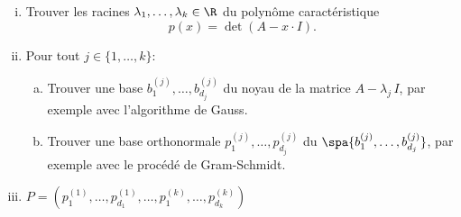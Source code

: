 \begin{enumerate}[i)] 
\item Trouver les racines $\lambda_1,\dots,\lambda_k \in \R$ du polynôme caractéristique 
  \begin{displaymath}
    p(x) = \det(A - x\cdot I). 
  \end{displaymath}
\item Pour tout $j \in \{1,\dots,k\}$:
  \begin{enumerate}[a)] 
  \item Trouver une base $b^{(j)}_1,\dots,b^{(j)}_{d_j}$ du noyau de la matrice $A - \lambda_j \, I$, par exemple avec l'algorithme de Gauss. 
  \item Trouver une base orthonormale $p^{(j)}_1,\dots,p^{(j)}_{d_j}$ du $\spa\{b^{(j)}_1,\dots,b^{(j)}_{d_j}\}$, par exemple avec le procédé de Gram-Schmidt. 
  \end{enumerate}
  \item $P = \left(p^{(1)}_1,\dots,p^{(1)}_{d_1},\dots,p^{(k)}_1,\dots,p^{(k)}_{d_k}\right)$ 
\end{enumerate}




